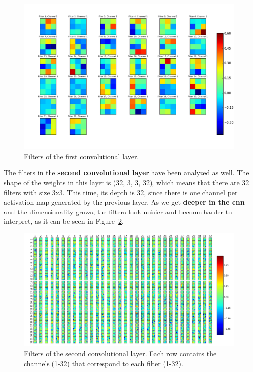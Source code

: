 \begin{figure}
	\centering
	\includegraphics[width=0.85\linewidth, keepaspectratio]{figures/weights_conv2d_1.png}
	\caption{Filters of the first convolutional layer.}
	\label{fig:filters}
\end{figure}

The filters in the \textbf{second convolutional layer} have been analyzed as well. The shape of the weights in this layer is (32, 3, 3, 32), which means that there are 32 filters with size 3x3. This time, its depth is 32, since there is one channel per activation map generated by the previous layer. As we get \textbf{deeper in the \gls{cnn}} and the dimensionality grows, the filters look noisier and become harder to interpret, as it can be seen in Figure~\ref{fig:filters2}.
\begin{figure}
	\centering
	\includegraphics[width=1\linewidth, keepaspectratio]{figures/weights_conv2d_2.png}
	\caption[Filters of the second convolutional layer.]{Filters of the second convolutional layer. Each row contains the channels (1-32) that correspond to each filter (1-32).}
	\label{fig:filters2}
\end{figure}

